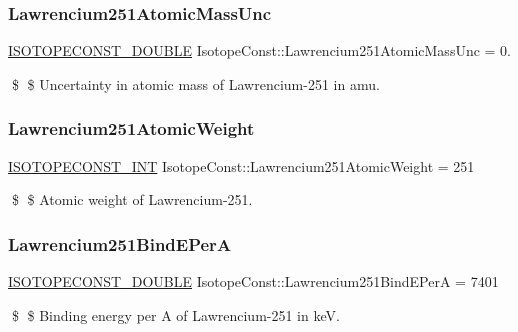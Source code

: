 \subsubsection{\texorpdfstring{Lawrencium251\+Atomic\+Mass\+Unc}{Lawrencium251AtomicMassUnc}}
{\footnotesize\ttfamily \mbox{\hyperlink{group___isotope_const-_macros_ga8f45a7272ce02c0b4c65c44636ed719a}{I\+S\+O\+T\+O\+P\+E\+C\+O\+N\+S\+T\+\_\+\+D\+O\+U\+B\+LE}} Isotope\+Const\+::\+Lawrencium251\+Atomic\+Mass\+Unc = 0.}

\$ \$ Uncertainty in atomic mass of Lawrencium-\/251 in amu. \mbox{\label{group___isotope_const-_lawrencium-_lr251_ga10df17f0619ec390e6de6dc8756c6738}} 
\subsubsection{\texorpdfstring{Lawrencium251\+Atomic\+Weight}{Lawrencium251AtomicWeight}}
{\footnotesize\ttfamily \mbox{\hyperlink{group___isotope_const-_macros_ga5f18360b3e99483a35c32d789e62621c}{I\+S\+O\+T\+O\+P\+E\+C\+O\+N\+S\+T\+\_\+\+I\+NT}} Isotope\+Const\+::\+Lawrencium251\+Atomic\+Weight = 251}

\$ \$ Atomic weight of Lawrencium-\/251. \mbox{\label{group___isotope_const-_lawrencium-_lr251_ga0223a61b0d369b67f26886c3bab27a6b}} 
\subsubsection{\texorpdfstring{Lawrencium251\+Bind\+E\+PerA}{Lawrencium251BindEPerA}}
{\footnotesize\ttfamily \mbox{\hyperlink{group___isotope_const-_macros_ga8f45a7272ce02c0b4c65c44636ed719a}{I\+S\+O\+T\+O\+P\+E\+C\+O\+N\+S\+T\+\_\+\+D\+O\+U\+B\+LE}} Isotope\+Const\+::\+Lawrencium251\+Bind\+E\+PerA = 7401}

\$ \$ Binding energy per A of Lawrencium-\/251 in keV. \mbox{\label{group___isotope_const-_lawrencium-_lr251_gaf8206413e8529acad546b1d28c4ac9f2}} 
